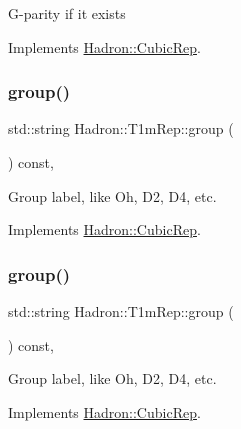 G-\/parity if it exists 

Implements \mbox{\hyperlink{structHadron_1_1CubicRep_a52104e43266d1614c00bbd1c3b395458}{Hadron\+::\+Cubic\+Rep}}.

\mbox{\label{structHadron_1_1T1mRep_a2a7b361109dcc3a8e98a36eedc223470}} 
\subsubsection{\texorpdfstring{group()}{group()}\hspace{0.1cm}{\footnotesize\ttfamily [1/2]}}
{\footnotesize\ttfamily std\+::string Hadron\+::\+T1m\+Rep\+::group (\begin{DoxyParamCaption}{ }\end{DoxyParamCaption}) const\hspace{0.3cm}{\ttfamily [inline]}, {\ttfamily [virtual]}}

Group label, like Oh, D2, D4, etc. 

Implements \mbox{\hyperlink{structHadron_1_1CubicRep_a0748f11ec87f387062c8e8981339a29c}{Hadron\+::\+Cubic\+Rep}}.

\mbox{\label{structHadron_1_1T1mRep_a2a7b361109dcc3a8e98a36eedc223470}} 
\subsubsection{\texorpdfstring{group()}{group()}\hspace{0.1cm}{\footnotesize\ttfamily [2/2]}}
{\footnotesize\ttfamily std\+::string Hadron\+::\+T1m\+Rep\+::group (\begin{DoxyParamCaption}{ }\end{DoxyParamCaption}) const\hspace{0.3cm}{\ttfamily [inline]}, {\ttfamily [virtual]}}

Group label, like Oh, D2, D4, etc. 

Implements \mbox{\hyperlink{structHadron_1_1CubicRep_a0748f11ec87f387062c8e8981339a29c}{Hadron\+::\+Cubic\+Rep}}.

\mbox{\label{structHadron_1_1T1mRep_ae8b584d4fdf7f81112d718a300fdbf5b}} 
